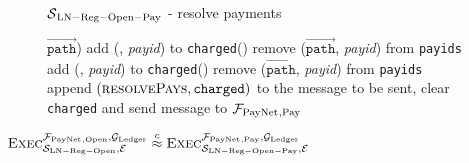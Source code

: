 \begin{figure}[H]
\begin{simulatorbox}{$\mathcal{S}{}_{\mathrm{LN - Reg - Open - Pay}}$ - resolve
  payments}
\begin{algorithmic}[1]
{            $\overrightarrow{\mathtt{path}}$)}
              \State add (\alice, \textit{payid}) to \texttt{charged}(\alice)
              \State remove ($\overrightarrow{\mathtt{path}}$, \textit{payid})
              from \texttt{payids}
             
              \State add (\alice, \textit{payid}) to \texttt{charged}(\alice)
              \State remove ($\overrightarrow{\mathtt{path}}$, \textit{payid})
              from \texttt{payids}
            \EndIf
          \EndFor
        \EndFor
        \State append $\left(\textsc{resolvePays}, \mathtt{charged}\right)$ to
        the message to be sent, clear \texttt{charged} and send message to
        $\mathcal{F}_{\mathrm{PayNet}}{}_{\mathrm{, Pay}}$
      \EndIndent
    \end{algorithmic}
  \end{simulatorbox}
  \caption{}
  \label{alg:sim:resolvepay}
\end{figure}

\begin{lemma}
  \label{lemma:pay}
  $\textsc{Exec}^{\mathcal{F}_{\mathrm{PayNet}}{}_{\mathrm{, Open}}, \mathcal{G}_{\mathrm{Ledger}}}_{\mathcal{S}_{\mathrm{LN
  - Reg - Open}}, \mathcal{E}} \overset{c}{\approx}
  \textsc{Exec}^{\mathcal{F}_{\mathrm{PayNet}}{}_{\mathrm{, Pay}}, \mathcal{G}_{\mathrm{Ledger}}}_{\mathcal{S}_{\mathrm{LN -
  Reg - Open - Pay}}, \mathcal{E}}$
\end{lemma}

